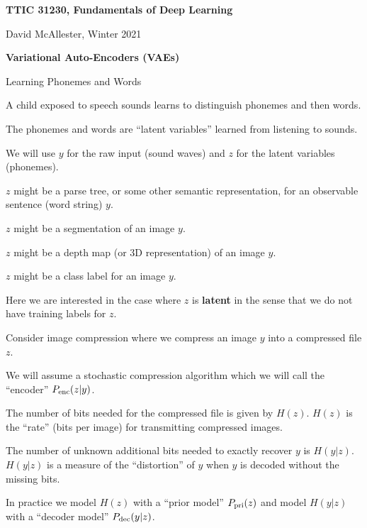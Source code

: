 




{\Huge

  \centerline{\bf TTIC 31230, Fundamentals of Deep Learning}
  \bigskip
  \centerline{David McAllester, Winter 2021}
  \vfill
  \vfill
  \centerline{\bf Variational Auto-Encoders (VAEs)}
  \vfill
  \vfill

{Learning Phonemes and Words}

A child exposed to speech sounds learns to distinguish phonemes and then words.

\vfill
The phonemes and words are ``latent variables'' learned from listening to sounds.

\vfill
We will use $y$ for the raw input (sound waves) and $z$ for the latent variables (phonemes).


$z$ might be a parse tree, or some other semantic representation, for an observable sentence (word string) $y$.

\vfill
$z$ might be a segmentation of an image $y$.

\vfill
$z$ might be a depth map (or 3D representation) of an image $y$.

\vfill
$z$ might be a class label for an image $y$.

\vfill
Here we are interested in the case where $z$ is {\bf latent} in the sense that we do not have training labels for $z$.


Consider image compression where we compress an image $y$ into a compressed file $z$.

\vfill
We will assume a stochastic compression algorithm
which we will call the ``encoder'' $P_{\mathrm{enc}}(z|y)$.

\vfill
The number of bits needed for the compressed file is given by $H(z)$.  $H(z)$
is the ``rate'' (bits per image) for transmitting compressed images.

\vfill
The number of unknown additional bits needed to exactly recover $y$ is $H(y|z)$.
$H(y|z)$ is a measure of the ``distortion'' of $y$ when $y$ is decoded without the missing bits.


In practice we model $H(z)$ with a ``prior model'' $P_{\mathrm{pri}}(z)$ and model $H(y|z)$ with a ``decoder model''
$P_{\mathrm{dec}}(y|z)$.

}
